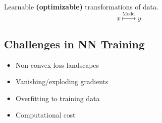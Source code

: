 \begin{definition}
    Learnable \textbf{(optimizable)} transformations of data.
    \begin{equation}
        x \overset{\text{Model}}{\mapsto} y
    \end{equation}
\end{definition}

\subsection{Challenges in NN Training}
\begin{notes}
    \begin{itemize}
        \item Non-convex loss landscapes
        \item Vanishing/exploding gradients
        \item Overfitting to training data
        \item Computational cost
    \end{itemize}
\end{notes}
\newpage

